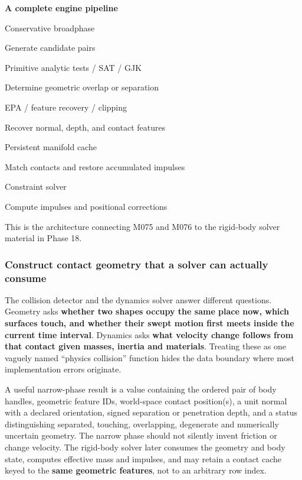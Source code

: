 \textbf{A complete engine pipeline}

Conservative broadphase

Generate candidate pairs

Primitive analytic tests / SAT / GJK

Determine geometric overlap or separation

EPA / feature recovery / clipping

Recover normal, depth, and contact features

Persistent manifold cache

Match contacts and restore accumulated impulses

Constraint solver

Compute impulses and positional corrections

This is the architecture connecting M075 and M076 to the rigid-body solver material in Phase 18.

\subsubsection{Construct contact geometry that a solver can actually consume}\label{04-visual-computing-ii-ch026-construct-contact-geometry-that-a-solver-can-actually-consume}

The collision detector and the dynamics solver answer different questions. Geometry asks \textbf{whether two shapes occupy the same place now, which surfaces touch, and whether their swept motion first meets inside the current time interval}. Dynamics asks \textbf{what velocity change follows from that contact given masses, inertia and materials}. Treating these as one vaguely named ``physics collision'' function hides the data boundary where most implementation errors originate.

A useful narrow-phase result is a value containing the ordered pair of body handles, geometric feature IDs, world-space contact position(s), a unit normal with a declared orientation, signed separation or penetration depth, and a status distinguishing separated, touching, overlapping, degenerate and numerically uncertain geometry. The narrow phase should not silently invent friction or change velocity. The rigid-body solver later consumes the geometry and body state, computes effective mass and impulses, and may retain a contact cache keyed to the \textbf{same geometric features}, not to an arbitrary row index.

